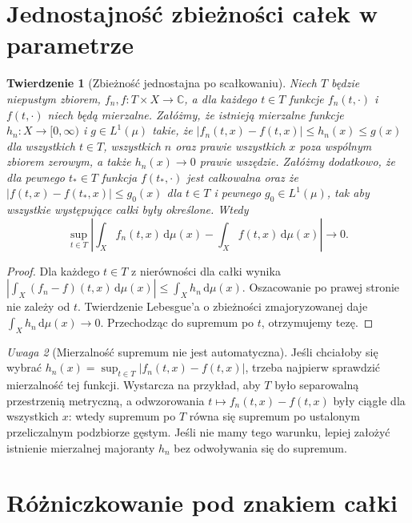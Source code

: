 \documentclass[11pt,a4paper,oneside]{book}
\numberwithin{equation}{chapter}
\theoremstyle{plain}
\newtheorem{twierdzenie}{Twierdzenie}[chapter]
\theoremstyle{definition}
\theoremstyle{remark}
\newtheorem{uwaga}[twierdzenie]{Uwaga}
\begin{document}
\section{Jednostajność zbieżności całek w parametrze}

\begin{twierdzenie}[Zbieżność jednostajna po scałkowaniu]
\label{thm:uniform-parameter-11}
Niech $T$ będzie niepustym zbiorem, $f_n,f:T\times X\to\mathbb C$,
a dla każdego $t\in T$ funkcje $f_n(t,\cdot)$ i $f(t,\cdot)$
niech będą mierzalne. Załóżmy, że istnieją mierzalne funkcje
$h_n:X\to[0,\infty)$ i $g\in L^1(\mu)$ takie, że
$|f_n(t,x)-f(t,x)|\le h_n(x)\le g(x)$
dla wszystkich $t\in T$, wszystkich $n$ oraz prawie wszystkich
$x$ poza wspólnym zbiorem zerowym, a także $h_n(x)\to0$
prawie wszędzie. Załóżmy dodatkowo, że dla pewnego
$t_*\in T$ funkcja $f(t_*,\cdot)$ jest całkowalna oraz że
$|f(t,x)-f(t_*,x)|\le g_0(x)$ dla $t\in T$ i pewnego
$g_0\in L^1(\mu)$, tak aby wszystkie występujące całki były
określone. Wtedy
\[
\sup_{t\in T}\left|\int_X f_n(t,x)\,\mathrm d\mu(x)
-\int_Xf(t,x)\,\mathrm d\mu(x)\right|\longrightarrow0.
\]
\end{twierdzenie}
\begin{proof}
Dla każdego $t\in T$ z nierówności dla całki wynika
$|\int_X(f_n-f)(t,x)\,\mathrm d\mu(x)|\le\int_Xh_n\,\mathrm d\mu(x)$.
Oszacowanie po prawej stronie nie zależy od $t$.
Twierdzenie Lebesgue'a o zbieżności zmajoryzowanej daje
$\int_Xh_n\,\mathrm d\mu(x)\to0$. Przechodząc do supremum
po $t$, otrzymujemy tezę.
\end{proof}

\begin{uwaga}[Mierzalność supremum nie jest automatyczna]
Jeśli chciałoby się wybrać $h_n(x)=\sup_{t\in T}|f_n(t,x)-f(t,x)|$,
trzeba najpierw sprawdzić mierzalność tej funkcji. Wystarcza
na przykład, aby $T$ było separowalną przestrzenią metryczną,
a odwzorowania $t\mapsto f_n(t,x)-f(t,x)$ były ciągłe dla
wszystkich $x$: wtedy supremum po $T$ równa się supremum
po ustalonym przeliczalnym podzbiorze gęstym. Jeśli nie
mamy tego warunku, lepiej założyć istnienie mierzalnej
majoranty $h_n$ bez odwoływania się do supremum.
\end{uwaga}

\section{Różniczkowanie pod znakiem całki}
\end{document}
